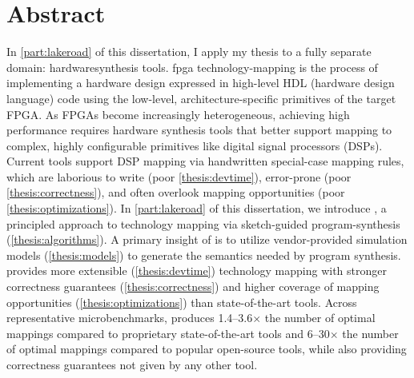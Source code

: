 \chapter*{ Abstract}

In \cref{part:lakeroad} of this dissertation,
  I apply my thesis
  to a fully separate domain:
  \gls{hardwaresynthesis} tools.
\gls{fpga} \gls{technology-mapping} is the process of
  implementing a hardware design expressed in 
  high-level HDL (hardware design language) code
  using the low-level, architecture-specific \glspl{primitive} of 
  the target FPGA.
As FPGAs become increasingly heterogeneous, 
  achieving high performance
  requires hardware synthesis tools 
  that better support mapping to complex, 
  highly configurable primitives 
  like digital signal processors (DSPs).
Current tools
  support DSP mapping via handwritten special-case mapping rules,
  which are laborious to write
  (poor \cref{thesis:devtime}),
  error-prone
  (poor \cref{thesis:correctness}),
  and often overlook mapping opportunities
  (poor \cref{thesis:optimizations}).
In \cref{part:lakeroad} of this dissertation,
  we introduce \lr,
  a principled approach to technology mapping via
  sketch-guided \gls{program-synthesis}
  (\cref{thesis:algorithms}).
A primary insight of \lr
  is to utilize vendor-provided
  simulation models
  (\cref{thesis:models})
  to generate the semantics
  needed by program synthesis.
\lr provides more
  extensible (\cref{thesis:devtime})
  technology mapping 
  with stronger correctness guarantees
  (\cref{thesis:correctness})
  and higher coverage of 
  mapping opportunities
  (\cref{thesis:optimizations})
  than state-of-the-art tools.
Across representative microbenchmarks,
  \lr produces
  1.4--3.6$\times$ the number of optimal mappings
  compared to proprietary state-of-the-art tools
  and
  6--30$\times$ the number of optimal mappings
  compared to popular open-source tools,
  while also providing correctness guarantees
  not given by any other tool.